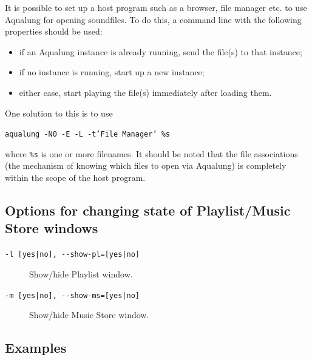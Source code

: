 \documentclass[10pt,english]{article}
\begin{document}
\noindent It is possible to set up a host program such as a
browser, file manager etc. to use Aqualung for opening
soundfiles. To do this, a command line with the following
properties should be used:


\begin{itemize}
\item if an Aqualung instance is already running, send the file(s) to that instance;
\item if no instance is running, start up a new instance;
\item either case, start playing the file(s) immediately after loading them.
\end{itemize}



\noindent One solution to this is to use


\begin{description}

\item [\texttt{aqualung -N0 -E -L -t'File Manager' \%s}]
\end{description}



\noindent where \texttt{\%s} is one or more filenames. It should be noted
that the file associations (the mechanism of knowing which
files to open via Aqualung) is completely within the scope
of the host program.






\subsection{Options for changing state of Playlist/Music Store windows\label{idp442608}}

\begin{description}

\item [
\texttt{-l [yes|no], {-}{-}show-pl=[yes|no]}
]

Show/hide Playlist window.

\item [
\texttt{-m [yes|no], {-}{-}show-ms=[yes|no]}
]

Show/hide Music Store window.

\end{description}



\subsection{Examples\label{idp446464}}
\end{document}
